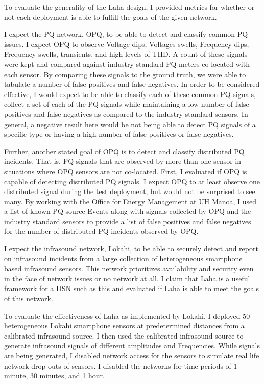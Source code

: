 To evaluate the generality of the Laha design, I provided metrics for whether or not each deployment is able to fulfill the goals of the given network.

I expect the PQ network, OPQ, to be able to detect and classify common PQ issues. I expect OPQ to observe Voltage dips, Voltages swells, Frequency dips, Frequency swells, transients, and high levels of THD. A count of these signals were kept and compared against industry standard PQ meters co-located with each sensor. By comparing these signals to the ground truth, we were able to tabulate a number of false positives and false negatives. In order to be considered effective, I would expect to be able to classify each of these common PQ signals, collect a set of each of the PQ signals while maintaining a low number of false positives and false negatives as compared to the industry standard sensors. In general, a negative result here would be not being able to detect PQ signals of a specific type or having a high number of false positives or false negatives.

Further, another stated goal of OPQ is to detect and classify distributed PQ incidents. That is, PQ signals that are observed by more than one sensor in situations where OPQ sensors are not co-located. First, I evaluated if OPQ is capable of detecting distributed PQ signals. I expect OPQ to at least observe one distributed signal during the test deployment, but would not be surprised to see many. By working with the Office for Energy Management at UH Manoa, I used a list of known PQ source Events along with signals collected by OPQ and the industry standard sensors to provide a list of false positives and false negatives for the number of distributed PQ incidents observed by OPQ\@.

I expect the infrasound network, Lokahi, to be able to securely detect and report on infrasound incidents from a large collection of heterogeneous smartphone based infrasound sensors. This network prioritizes availability and security even in the face of network issues or no network at all. I claim that Laha is a useful framework for a DSN such as this and evaluated if Laha is able to meet the goals of this network.

To evaluate the effectiveness of Laha as implemented by Lokahi, I deployed 50 heterogeneous Lokahi smartphone sensors at predetermined distances from a calibrated infrasound source. I then used the calibrated infrasound source to generate infrasound signals of different amplitudes and Frequencies. While signals are being generated, I disabled network access for the sensors to simulate real life network drop outs of sensors. I disabled the networks for time periods of 1 minute, 30 minutes, and 1 hour.

